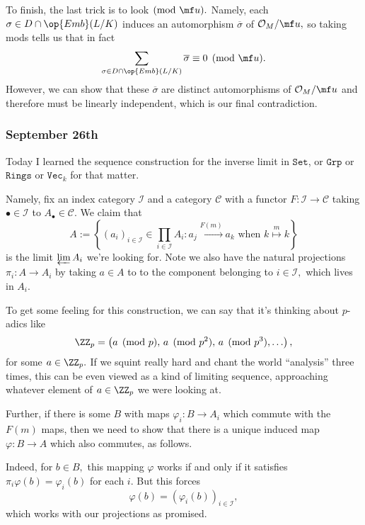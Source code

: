 To finish, the last trick is to look$\pmod{\mf u}.$ Namely, each $\sigma\in D\cap\op{Emb}(L/K)$ induces an automorphism $\overline\sigma$ of $\mathcal O_M/\mf u,$ so taking mods tells us that in fact
\[\sum_{\sigma\in D\cap\op{Emb}(L/K)}\overline\sigma\equiv0\pmod{\mf u}.\]
However, we can show that these $\overline\sigma$ are distinct automorphisms of $\mathcal O_M/\mf u$ and therefore must be linearly independent, which is our final contradiction.

\subsubsection{September 26th}
Today I learned the sequence construction for the inverse limit in $\texttt{Set}$, or $\texttt{Grp}$ or $\texttt{Rings}$ or $\texttt{Vec}_k$ for that matter.

Namely, fix an index category $\mathcal I$ and a category $\mathcal C$ with a functor $F:\mathcal I\to\mathcal C$ taking $\bullet\in\mathcal I$ to $A_\bullet\in\mathcal C.$ We claim that
\[A:=\left\{(a_i)_{i\in\mathcal I}\in\prod_{i\in\mathcal I}A_i:a_j\stackrel{F(m)}\longmapsto a_k\text{ when }k\stackrel m\longmapsto k\right\}\]
is the limit $\varprojlim A_i$ we're looking for. Note we also have the natural projections $\pi_i:A\to A_i$ by taking $a\in A$ to to the component belonging to $i\in\mathcal I,$ which lives in $A_i.$

To get some feeling for this construction, we can say that it's thinking about $p$-adics like
\[\ZZ_p=\left(a\pmod p,\,a\pmod{p^2},\,a\pmod{p^3},\ldots\right),\]
for some $a\in\ZZ_p.$ If we squint really hard and chant the world ``analysis'' three times, this can be even viewed as a kind of limiting sequence, approaching whatever element of $a\in\ZZ_p$ we were looking at.

Further, if there is some $B$ with maps $\varphi_i:B\to A_i$ which commute with the $F(m)$ maps, then we need to show that there is a unique induced map $\varphi:B\to A$ which also commutes, as follows.
\begin{center}
\end{center}
Indeed, for $b\in B,$ this mapping $\varphi$ works if and only if it satisfies $\pi_i\varphi(b)=\varphi_i(b)$ for each $i.$ But this forces
\[\varphi(b)=(\varphi_i(b))_{i\in\mathcal I},\]
which works with our projections as promised.

